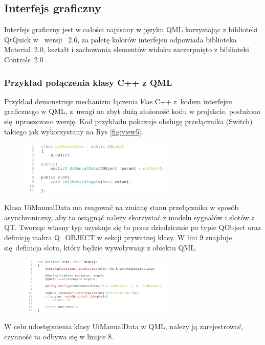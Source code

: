 \documentclass[12pt, eng, twoside, openany, final]{mgr}
\begin{document}
                \subsection{Interfejs graficzny}
                Interfejs graficzny jest w całości napisany w języku QML korzystając z biblioteki QtQuick w~ wersji~ 2.6\cite{qtQuick2.6}, za paletę kolorów interfejsu odpowiada biblioteka Material~2.0\cite{qtMaterial2}, kształt i zachowania elementów widoku zaczerpnięto z biblioteki Controls~2.0 \cite{qtControls2}. 
                
                \subsubsection{Przykład połączenia klasy C++ z QML}
                Przykład demonstruje mechanizm łączenia klas C++ z~kodem interfejsu graficznego w QML, z~uwagi na zbyt dużą złożoność kodu w projekcie, posłużono się uproszczono wersję. Kod przykładu pokazuje obsługę przełącznika (Switch) takiego jak wykorzystany na Rys \ref{fig:view5}.
                    \begin{figure}[H]
                    \begin{center}
                        \includegraphics[width=0.65\textwidth]{code_class.jpg}
                    \end{center}
                    \end{figure}
\noindent                    Klasa UiManualData ma reagować na zmianę stanu przełącznika w sposób asynchroniczny, aby to osiągnąć należy skorzystać z modelu sygnałów i slotów z QT. Tworząc własny typ uzyskuje się to przez dziedzicznie po typie QObject oraz definicję makra Q\_OBJECT w sekcji prywatnej klasy. W lini 9 znajduje się definicja slotu, który będzie wywoływany z obiektu QML.
                    
                    \begin{figure}[H]
                    \begin{center}
                        \includegraphics[width=0.65\textwidth]{code_main.jpg}
                    \end{center}
                    \end{figure}
                    W celu udostępnienia klasy UiManualData w QML, należy ją zarejestrować, czynność ta odbywa się w linijce 8.
                    
\end{document}
